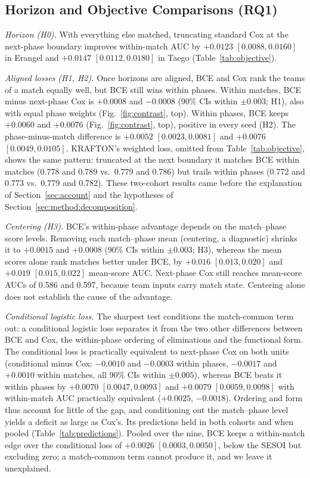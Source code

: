 \documentclass[sigconf,anonymous]{acmart}
\begin{document}
\subsection{Horizon and Objective Comparisons (RQ1)}
\label{sec:results:rq1}

\emph{Horizon (H0).} With everything else matched, truncating standard Cox at the next-phase boundary improves within-match AUC by $+0.0123$ $[0.0088,\allowbreak 0.0160]$ in Erangel and $+0.0147$ $[0.0112,\allowbreak 0.0180]$ in Taego (Table~\ref{tab:objective}).

\emph{Aligned losses (H1, H2).} Once horizons are aligned, BCE and Cox rank the teams of a match equally well, but BCE still wins within phases. Within matches, BCE minus next-phase Cox is $+0.0008$ and $-0.0008$ (90\% CIs within $\pm0.003$; H1), also with equal phase weights (Fig.~\ref{fig:contrast}, top). Within phases, BCE keeps $+0.0060$ and $+0.0076$ (Fig.~\ref{fig:contrast}, top), positive in every seed (H2). The phase-minus-match difference is $+0.0052$ $[0.0023,\allowbreak 0.0081]$ and $+0.0076$ $[0.0049,\allowbreak 0.0105]$. KRAFTON's weighted loss, omitted from Table~\ref{tab:objective}, shows the same pattern: truncated at the next boundary it matches BCE within matches (0.778 and 0.789 vs.\ 0.779 and 0.786) but trails within phases (0.772 and 0.773 vs.\ 0.779 and 0.782). These two-cohort results came before the explanation of Section~\ref{sec:account} and the hypotheses of Section~\ref{sec:method:decomposition}.

\emph{Centering (H3).} BCE's within-phase advantage depends on the match--phase score levels. Removing each match--phase mean (centering, a diagnostic) shrinks it to $+0.0015$ and $+0.0008$ (90\% CIs within $\pm0.003$; H3), whereas the mean scores alone rank matches better under BCE, by $+0.016$ $[0.013,\allowbreak 0.020]$ and $+0.019$ $[0.015,\allowbreak 0.022]$ mean-score AUC. Next-phase Cox still reaches mean-score AUCs of 0.586 and 0.597, because team inputs carry match state. Centering alone does not establish the cause of the advantage.

\emph{Conditional logistic loss.} The sharpest test conditions the match-common term out: a conditional logistic loss separates it from the two other differences between BCE and Cox, the within-phase ordering of eliminations and the functional form. The conditional loss is practically equivalent to next-phase Cox on both units (conditional minus Cox: $-0.0010$ and $-0.0003$ within phases, $-0.0017$ and $+0.0010$ within matches, all 90\% CIs within $\pm0.005$), whereas BCE beats it within phases by $+0.0070$ $[0.0047,\allowbreak 0.0093]$ and $+0.0079$ $[0.0059,\allowbreak 0.0098]$ with within-match AUC practically equivalent ($+0.0025$, $-0.0018$). Ordering and form thus account for little of the gap, and conditioning out the match--phase level yields a deficit as large as Cox's. Its predictions held in both cohorts and when pooled (Table~\ref{tab:predictions}). Pooled over the nine, BCE keeps a within-match edge over the conditional loss of $+0.0026$ $[0.0003,\allowbreak 0.0050]$, below the SESOI but excluding zero; a match-common term cannot produce it, and we leave it unexplained.
\end{document}
